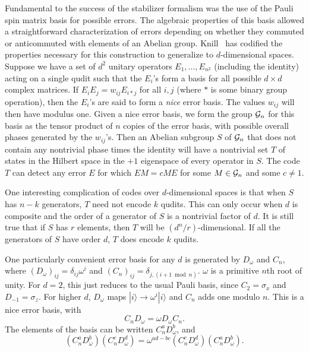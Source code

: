 \documentclass{report}
\newcommand{\G}{{\cal G}}
\newcommand{\ket}[1]{|{#1}\rangle}
\newcommand{\X}{\sigma_x}
\newcommand{\Z}{\sigma_z}
\begin{document}
Fundamental to the success of the stabilizer formalism was the use of the
Pauli spin matrix basis for possible errors.  The algebraic properties of
this basis allowed a straightforward characterization of errors depending
on whether they commuted or anticommuted with elements of an Abelian group.
Knill~\cite{knill-qudit} has codified the properties necessary for this 
construction to generalize to $d$-dimensional spaces.  Suppose we have a
set of $d^2$ unitary operators $E_1, \ldots, E_{n^2}$ (including the 
identity) acting on a single qudit such that the $E_i$'s form a basis for all
possible $d \times d$ complex matrices.  If $E_i E_j = w_{ij} E_{i*j}$ for all 
$i, j$ (where $*$ is some binary group operation), then the $E_i$'s are said to 
form a {\em nice} error basis.  The values $w_{ij}$ will then have modulus one. 
Given a nice error basis, we form the group $\G_n$ for this basis as the tensor
product of $n$ copies of the error basis, with possible overall phases
generated by the $w_{ij}$'s.  Then an Abelian subgroup $S$ of $\G_n$ that does
not contain any nontrivial phase times the identity will have a nontrivial
set $T$ of states in the Hilbert space in the $+1$ eigenspace of every operator
in $S$.  The code $T$ can detect any error $E$ for which $E M = c M E$ for some
$M \in \G_n$ and some $c \neq 1$.

One interesting complication of codes over $d$-dimensional spaces is that
when $S$ has $n-k$ generators, $T$ need not encode $k$ qudits.  This can
only occur when $d$ is composite and the order of a generator of $S$ is
a nontrivial factor of $d$.  It is still true that if $S$ has $r$ elements,
then $T$ will be $(d^n/r)$-dimensional.  If all the generators of $S$ have
order $d$, $T$ does encode $k$ qudits.

One particularly convenient error basis for any $d$ is generated by
$D_\omega$ and $C_n$, where $(D_\omega)_{ij} = \delta_{ij} \omega^i$ and
$(C_n)_{ij} = \delta_{j, (i+1 \bmod n)}$.  $\omega$ is a primitive $n$th
root of unity.  For $d=2$, this just reduces to the usual Pauli basis,
since $C_2 = \X$ and $D_{-1} = \Z$.  For higher $d$, $D_\omega$ maps
$\ket{i} \rightarrow \omega^i \ket{i}$ and $C_n$ adds one modulo $n$.
This is a nice error basis, with
\begin{equation}
C_n D_\omega = \omega D_\omega C_n.
\end{equation}
The elements of the basis can be written $C_n^a D_\omega^b$, and 
\begin{equation}
\left( C_n^a D_\omega^b \right) \left( C_n^c D_\omega^d \right) =
\omega^{ad-bc} \left( C_n^c D_\omega^d \right) \left( C_n^a D_\omega^b \right).
\end{equation}
\end{document}
